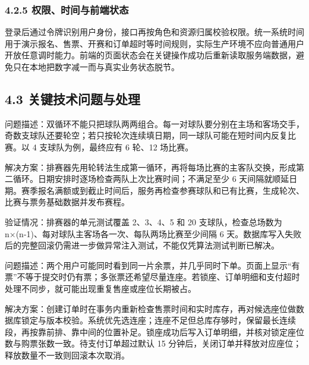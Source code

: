 \documentclass[UTF8,zihao=-4,a4paper]{ctexart}
\begin{document}
\subsubsection*{4.2.5 权限、时间与前端状态}

登录后通过令牌识别用户身份，接口再按角色和资源归属校验权限。统一系统时间用于演示报名、售票、开赛和订单超时等时间规则，实际生产环境不应向普通用户开放任意调时能力。前端的页面状态会在关键操作成功后重新读取服务端数据，避免只在本地把数字减一而与真实业务状态脱节。


\subsection*{4.3 关键技术问题与处理}

\par\medskip{}\par\nobreak\smallskip

问题描述：双循环不能只把球队两两组合。每一对球队要分别在主场和客场交手，奇数支球队还要轮空；若只按轮次连续填日期，同一球队可能在短时间内反复比赛。以 4 支球队为例，最终应有 6 轮、12 场比赛。


解决方案：排赛器先用轮转法生成第一循环，再将每场比赛的主客队交换，形成第二循环。日期安排时逐场检查两队上次比赛时间；不满足至少 6 天间隔就顺延日期。赛季报名满额或到截止时间后，服务再检查参赛球队和已有比赛，生成轮次、比赛与票务基础数据并发布赛程。


验证情况：排赛器的单元测试覆盖 2、3、4、5 和 20 支球队，检查总场数为 n×(n-1)、每对球队主客场各一次、每队两场比赛至少间隔 6 天。数据库写入失败后的完整回滚仍需进一步做异常注入测试，不能仅凭算法测试判断已解决。


\par\medskip{}\par\nobreak\smallskip

问题描述：两个用户可能同时看到同一片余票，并几乎同时下单。页面上显示“有票”不等于提交时仍有票；多张票还希望尽量连座。若锁座、订单明细和支付超时处理不同步，就可能出现重复售座或座位长期被占。


解决方案：创建订单时在事务内重新检查售票时间和实时库存，再对候选座位做数据库锁定与版本校验。系统优先选连座；连座不足但总库存够时，保留最长连续段，再按靠前排、靠中间的位置补足。锁座成功后写入订单明细，并核对锁定座位数与购票张数一致。待支付订单超过默认 15 分钟后，关闭订单并释放对应座位；释放数量不一致则回滚本次取消。
\end{document}
